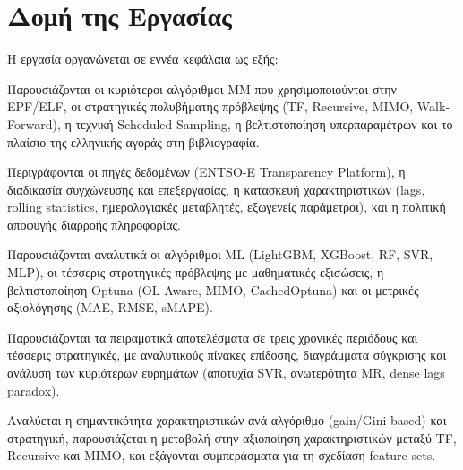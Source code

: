 \section{Δομή της Εργασίας}
\label{sec:structure}

Η εργασία οργανώνεται σε εννέα κεφάλαια ως εξής:

\begin{description}[leftmargin=0pt, style=nextline]
    \item[\textbf{Κεφάλαιο~\ref{ch:literature} — Βιβλιογραφική Ανασκόπηση:}]
    Παρουσιάζονται οι κυριότεροι αλγόριθμοι ΜΜ που χρησιμοποιούνται στην EPF/ELF,
    οι στρατηγικές πολυβήματης πρόβλεψης (TF, Recursive, MIMO, Walk-Forward), η
    τεχνική Scheduled Sampling, η βελτιστοποίηση υπερπαραμέτρων και το πλαίσιο της
    ελληνικής αγοράς στη βιβλιογραφία.

    \item[\textbf{Κεφάλαιο~\ref{ch:data} — Δεδομένα και Προεπεξεργασία:}]
    Περιγράφονται οι πηγές δεδομένων (ENTSO-E Transparency Platform), η διαδικασία
    συγχώνευσης και επεξεργασίας, η κατασκευή χαρακτηριστικών (lags, rolling
    statistics, ημερολογιακές μεταβλητές, εξωγενείς παράμετροι), και η πολιτική
    αποφυγής διαρροής πληροφορίας.

    \item[\textbf{Κεφάλαιο~\ref{ch:methods} — Μέθοδοι Πρόβλεψης:}]
    Παρουσιάζονται αναλυτικά οι αλγόριθμοι ML (LightGBM, XGBoost, RF, SVR, MLP),
    οι τέσσερις στρατηγικές πρόβλεψης με μαθηματικές εξισώσεις, η βελτιστοποίηση
    Optuna (OL-Aware, MIMO, CachedOptuna) και οι μετρικές αξιολόγησης (MAE, RMSE,
    sMAPE).

    \item[\textbf{Κεφάλαιο~\ref{ch:experiments} — Αποτελέσματα Αξιολόγησης:}]
    Παρουσιάζονται τα πειραματικά αποτελέσματα σε τρεις χρονικές περιόδους και
    τέσσερις στρατηγικές, με αναλυτικούς πίνακες επίδοσης, διαγράμματα σύγκρισης
    και ανάλυση των κυριότερων ευρημάτων (αποτυχία SVR, ανωτερότητα MR, dense lags
    paradox).

    \item[\textbf{Κεφάλαιο~\ref{ch:fi} — Σημαντικότητα Χαρακτηριστικών:}]
    Αναλύεται η σημαντικότητα χαρακτηριστικών ανά αλγόριθμο (gain/Gini-based) και
    στρατηγική, παρουσιάζεται η μεταβολή στην αξιοποίηση χαρακτηριστικών μεταξύ
    TF, Recursive και MIMO, και εξάγονται συμπεράσματα για τη σχεδίαση feature sets.


\end{description}
